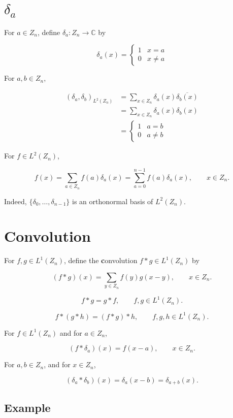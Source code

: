 \documentclass[11pt]{article} %
\begin{document}
\section{$\delta_a$}

For $a \in Z_n$, define $\delta_a:Z_n \to \mathbb{C}$ by

$$
\delta_a(x) = \begin{cases}
1&x=a\\
0&x \neq a
\end{cases}
$$

For $a,b \in Z_n$,

\begin{align*}
(\delta_a, \delta_b)_{L^2(Z_n)} &=\sum_{x \in Z_n} \delta_a(x) \overline{\delta_b(x)} \\
&=\sum_{x \in Z_n} \delta_a(x) \delta_b(x)\\
&= \begin{cases}
1&a = b\\
0&a \neq b
\end{cases}
\end{align*}

For $f \in L^2(Z_n)$,

$$
f(x) =\sum_{a \in Z_n} f(a) \delta_a(x) = \sum_{a=0}^{n-1} f(a) \delta_a(x),\qquad x \in Z_n.
$$

Indeed, $\{\delta_0,\ldots,\delta_{n-1}\}$ is an orthonormal basis of $L^2(Z_n)$.

\section{Convolution}

For $f,g \in L^1(Z_n)$, define the {\textbf convolution} $f*g \in L^1(Z_n)$ by

$$
(f*g)(x) = \sum_{y \in Z_n} f(y)g(x-y),\qquad x \in Z_n.
$$

$$
f*g = g*f,\qquad f,g \in L^1(Z_n).
$$

$$
f*(g*h) = (f*g)*h,\qquad f,g,h \in L^1(Z_n).
$$

For $f \in L^1(Z_n)$ and for $a \in Z_n$,

$$
(f*\delta_a)(x) = f(x-a),\qquad x \in Z_n.
$$

For $a,b \in Z_n$, and for $x \in Z_n$,

$$
(\delta_a*\delta_b)(x)=\delta_a(x-b)=\delta_{a+b}(x).
$$

\subsection{Example}
\end{document}
